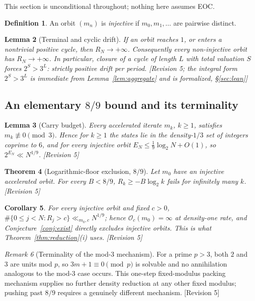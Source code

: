 \documentclass[11pt]{article}
\theoremstyle{plain}
\newtheorem{theorem}{Theorem}[section]
\newtheorem{lemma}[theorem]{Lemma}
\newtheorem{corollary}[theorem]{Corollary}
\theoremstyle{definition}
\newtheorem{definition}[theorem]{Definition}
\theoremstyle{remark}
\newtheorem{remark}[theorem]{Remark}
\newcommand{\Occ}{\mathcal{O}}
\newcommand{\status}[1]{\textsf{\footnotesize[#1]}}
\begin{document}
This section is unconditional throughout; nothing here assumes EOC.

\begin{definition}
An orbit $(m_n)$ is \emph{injective} if $m_0,m_1,\dots$ are pairwise distinct.
\end{definition}

\begin{lemma}[Terminal and cyclic drift]\label{lem:cycledrift}
If an orbit reaches $1$, or enters a nontrivial positive cycle, then $R_N\to+\infty$. Consequently
every non-injective orbit has $R_N\to+\infty$. In particular, closure of a cycle of length $L$ with
total valuation $S$ forces $2^S>3^L$: strictly positive drift per period.
\status{Revision 5; the integral form $2^S>3^L$ is immediate from Lemma~\ref{lem:aggregate} and is
formalized, \S\ref{sec:lean}}
\end{lemma}

\subsection{An elementary $8/9$ bound and its terminality}

\begin{lemma}[Carry budget]\label{lem:carrybudget}
Every accelerated iterate $m_k$, $k\ge1$, satisfies $m_k\not\equiv0\pmod 3$. Hence for $k\ge1$ the
states lie in the density-$1/3$ set of integers coprime to $6$, and for every injective orbit
$E_N\le\frac19\log_2 N+O(1)$, so $2^{E_N}\ll N^{1/9}$. \status{Revision 5}
\end{lemma}

\begin{theorem}[Logarithmic-floor exclusion, $8/9$]\label{thm:89}
Let $m_0$ have an injective accelerated orbit. For every $B<8/9$, $R_k\ge-B\log_2 k$ fails for
infinitely many $k$. \status{Revision 5}
\end{theorem}

\begin{corollary}\label{cor:injocc}
For every injective orbit and fixed $c>0$, $\#\{0\le j<N:R_j>c\}\ll_{m_0,c}N^{1/9}$; hence
$\Occ_c(m_0)=\infty$ at density-one rate, and Conjecture~\ref{conj:exist} directly excludes
injective orbits. This is what Theorem~\ref{thm:reduction}(i) uses. \status{Revision 5}
\end{corollary}

\begin{remark}[Terminality of the mod-$3$ mechanism]\label{rem:terminal}
For a prime $p>3$, both $2$ and $3$ are units mod $p$, so $3m+1\equiv0\pmod p$ is solvable and no
annihilation analogous to the mod-$3$ case occurs. This one-step fixed-modulus packing mechanism
supplies no further density reduction at any other fixed modulus; pushing past $8/9$ requires a
genuinely different mechanism. \status{Revision 5}
\end{remark}
\end{document}
